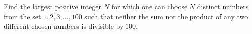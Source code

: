 Find the largest positive integer $N $ for which one can choose $N $ distinct numbers from the set ${1,2,3,...,100}$ such that neither the sum nor the product of any two different chosen numbers is divisible by $100$.